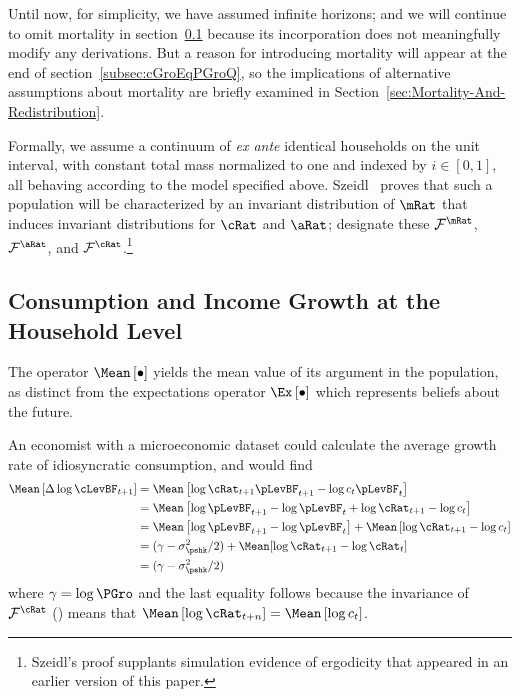 \documentclass[BufferStockTheory]{subfiles}
\begin{document}
Until now, for simplicity, we have assumed infinite horizons; and we will continue to omit mortality in section~\ref{subsec:cGroEqPGroIndQ} because its incorporation does not meaningfully modify any derivations.  But a reason for introducing mortality will appear at the end of section~\ref{subsec:cGroEqPGroQ}, so the implications of alternative assumptions about mortality are briefly examined in Section~\ref{sec:Mortality-And-Redistribution}.

Formally, we assume a continuum of \textit{ex ante} identical households on the unit interval, with constant total mass normalized to one and indexed by $i \in [0,1]$, all behaving according to the model specified above.  Szeidl~\citeyearpar{szeidlInvariant} proves that such a population will be characterized by an invariant distribution of $\mRat$ that induces invariant distributions for $\cRat$ and $\aRat$; designate these $\mathcal{F}^{\mRat}$, $\mathcal{F}^{\aRat}$, and $\mathcal{F}^{\cRat}$.\footnote{Szeidl's proof supplants simulation evidence of ergodicity that appeared in an earlier version of this paper.}


\hypertarget{Consumption-and-Income-Growth-at-the-Household-Level}{}
\subsection{Consumption and Income Growth at the Household Level}\label{subsec:cGroEqPGroIndQ}

The operator $\Mean\left[\bullet\right]$ yields the mean value of its argument in the population, as distinct from the expectations operator $\Ex\left[\bullet\right]$ which represents beliefs about the future.

An economist with a microeconomic dataset could calculate the average growth rate of idiosyncratic consumption, and would find
\begin{align*}
  \Mean\left[\Delta \log \cLevBF_{t+1}\right]  & = \Mean\left[ \log {\cRat}_{t+1}\pLevBF_{t+1} - \log c_{t}\pLevBF_{t}\right]  \notag \\
                                               & = \Mean\left[ \log \pLevBF_{t+1}- \log \pLevBF_{t} + \log {\cRat}_{t+1} - \log c_{t}\right]  \notag \\
                                               & = \Mean\left[ \log \pLevBF_{t+1}- \log \pLevBF_{t}\right] + \Mean\left[ \log {\cRat}_{t+1} - \log c_{t}\right]  \notag \\
                                               & = (\gamma - \sigma^{2}_{\pshk}/2) + \Mean[\log \cRat_{t+1} - \log \cRat_{t}] \\
                                               & = (\gamma - \sigma^{2}_{\pshk}/2)
\end{align*}
where $\gamma=\log \PGro$ and the last equality follows because the invariance of
$\mathcal{F}^{\cRat}$ (\cite{szeidlInvariant}) means that $\Mean\left[ \log
  {\cRat}_{t+n}\right] = \Mean\left[ \log
  c_{t}\right]$.
\end{document}
